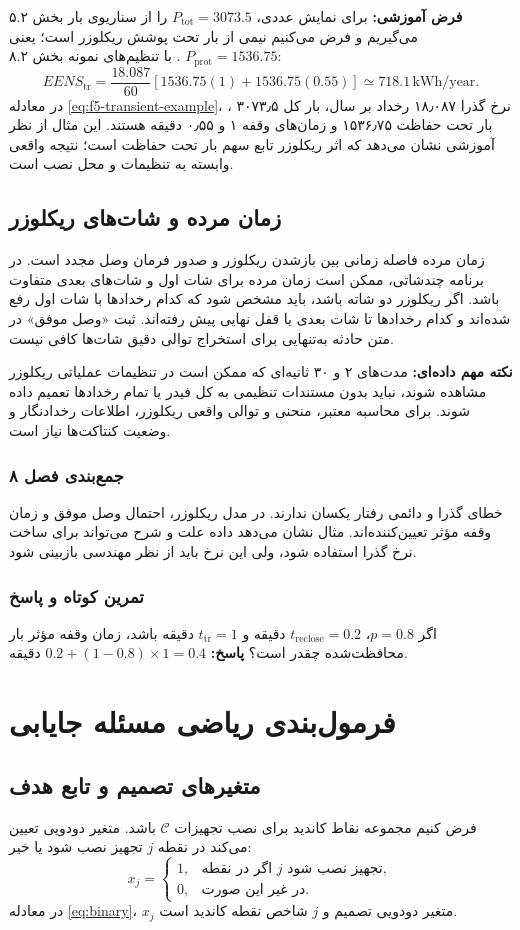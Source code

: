 \documentclass[11pt,a4paper,oneside]{book}
\newcommand{\file}[1]{\lr{\texttt{#1}}}
\newcommand{\unit}[1]{\,\mathrm{#1}}
\newcommand{\summary}[1]{\subsection*{جمع‌بندی فصل #1}}
\newcommand{\exercise}{\subsection*{تمرین کوتاه و پاسخ}}
\newcommand{\answer}{\noindent\textbf{پاسخ:} }
\newcommand{\warn}{\noindent\textbf{نکته مهم داده‌ای:} }
\newcommand{\assumption}{\noindent\textbf{فرض آموزشی:} }
\begin{document}
\assumption برای نمایش عددی، $P_{\mathrm{tot}}=3073.5$  را از سناریوی بار بخش ۵.۲ می‌گیریم و فرض می‌کنیم نیمی از بار تحت پوشش ریکلوزر است؛ یعنی $P_{\mathrm{prot}}=1536.75$ . با تنظیم‌های نمونه بخش ۸.۲:
\begin{equation}
 EENS_{\mathrm{tr}}=\frac{18.087}{60}\left[1536.75(1)+1536.75(0.55)\right]
 \simeq718.1\unit{kWh/year}.
 \label{eq:f5-transient-example}
\end{equation}
در معادله \eqref{eq:f5-transient-example}، نرخ گذرا ۱۸٫۰۸۷ رخداد بر سال، بار کل ۳۰۷۳٫۵ ، بار تحت حفاظت ۱۵۳۶٫۷۵  و زمان‌های وقفه ۱ و ۰٫۵۵ دقیقه هستند. این مثال از نظر آموزشی نشان می‌دهد که اثر ریکلوزر تابع سهم بار تحت حفاظت است؛ نتیجه واقعی وابسته به تنظیمات و محل نصب است.

\section{زمان مرده و شات‌های ریکلوزر}
زمان مرده فاصله زمانی بین بازشدن ریکلوزر و صدور فرمان وصل مجدد است. در برنامه چندشاتی، ممکن است زمان مرده برای شات اول و شات‌های بعدی متفاوت باشد. اگر ریکلوزر دو شاته باشد، باید مشخص شود که کدام رخدادها با شات اول رفع شده‌اند و کدام رخدادها تا شات بعدی یا قفل نهایی پیش رفته‌اند. ثبت «وصل موفق» در متن حادثه به‌تنهایی برای استخراج توالی دقیق شات‌ها کافی نیست.

\warn مدت‌های ۲ و ۳۰ ثانیه‌ای که ممکن است در تنظیمات عملیاتی ریکلوزر مشاهده شوند، نباید بدون مستندات تنظیمی به کل فیدر یا تمام رخدادها تعمیم داده شوند. برای محاسبه معتبر، منحنی و توالی واقعی ریکلوزر، اطلاعات رخدادنگار و وضعیت کنتاکت‌ها نیاز است.

\summary{۸}
خطای گذرا و دائمی رفتار یکسان ندارند. در مدل ریکلوزر، احتمال وصل موفق و زمان وقفه مؤثر تعیین‌کننده‌اند. مثال \file{5.xlsx} نشان می‌دهد داده علت و شرح می‌تواند برای ساخت نرخ گذرا استفاده شود، ولی این نرخ باید از نظر مهندسی بازبینی شود.

\exercise
اگر $p=0.8$، $t_{\mathrm{reclose}}=0.2$ دقیقه و $t_{\mathrm{tr}}=1$ دقیقه باشد، زمان وقفه مؤثر بار محافظت‌شده چقدر است؟
\answer $0.2+(1-0.8)\times1=0.4$ دقیقه.

\chapter{فرمول‌بندی ریاضی مسئله جایابی}
\section{متغیرهای تصمیم و تابع هدف}
فرض کنیم مجموعه نقاط کاندید برای نصب تجهیزات $\mathcal{C}$ باشد. متغیر دودویی تعیین می‌کند در نقطه $j$ تجهیز نصب شود یا خیر:
\begin{equation}
 x_j=\begin{cases}1,&\text{اگر در نقطه }j\text{ تجهیز نصب شود},\\0,&\text{در غیر این صورت.}\end{cases}
 \label{eq:binary}
\end{equation}
در معادله \eqref{eq:binary}، $x_j$ متغیر دودویی تصمیم و $j$ شاخص نقطه کاندید است.
\end{document}
